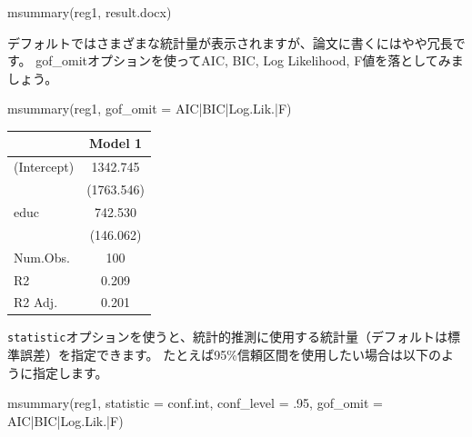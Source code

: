 \documentclass[
]{book}
\newenvironment{Shaded}{\begin{snugshade}}{\end{snugshade}}
\newcommand{\AttributeTok}[1]{\textcolor[rgb]{0.77,0.63,0.00}{#1}}
\newcommand{\DecValTok}[1]{\textcolor[rgb]{0.00,0.00,0.81}{#1}}
\newcommand{\FunctionTok}[1]{\textcolor[rgb]{0.00,0.00,0.00}{#1}}
\newcommand{\NormalTok}[1]{#1}
\newcommand{\StringTok}[1]{\textcolor[rgb]{0.31,0.60,0.02}{#1}}
\begin{document}
\begin{Shaded}
\begin{Highlighting}[]
\FunctionTok{msummary}\NormalTok{(reg1, }\StringTok{\textquotesingle{}result.docx\textquotesingle{}}\NormalTok{)}
\end{Highlighting}
\end{Shaded}

デフォルトではさまざまな統計量が表示されますが、論文に書くにはやや冗長です。
gof\_omitオプションを使ってAIC, BIC, Log Likelihood, F値を落としてみましょう。

\begin{Shaded}
\begin{Highlighting}[]
\FunctionTok{msummary}\NormalTok{(reg1, }\AttributeTok{gof\_omit =} \StringTok{\textquotesingle{}AIC|BIC|Log.Lik.|F\textquotesingle{}}\NormalTok{)}
\end{Highlighting}
\end{Shaded}

\begin{table}
\centering
\begin{tabular}[t]{lc}
\toprule
  & Model 1\\
\midrule
(Intercept) & \num{1342.745}\\
 & (\num{1763.546})\\
educ & \num{742.530}\\
 & (\num{146.062})\\
\midrule
Num.Obs. & \num{100}\\
R2 & \num{0.209}\\
R2 Adj. & \num{0.201}\\
\bottomrule
\end{tabular}
\end{table}

\texttt{statistic}オプションを使うと、統計的推測に使用する統計量（デフォルトは標準誤差）を指定できます。
たとえば95\%信頼区間を使用したい場合は以下のように指定します。

\begin{Shaded}
\begin{Highlighting}[]
\FunctionTok{msummary}\NormalTok{(reg1, }\AttributeTok{statistic =} \StringTok{\textquotesingle{}conf.int\textquotesingle{}}\NormalTok{, }\AttributeTok{conf\_level =}\NormalTok{ .}\DecValTok{95}\NormalTok{, }\AttributeTok{gof\_omit =} \StringTok{\textquotesingle{}AIC|BIC|Log.Lik.|F\textquotesingle{}}\NormalTok{)}
\end{Highlighting}
\end{Shaded}
\end{document}
